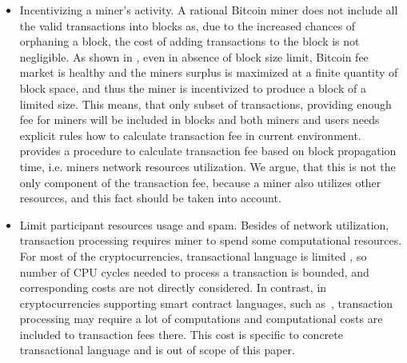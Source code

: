 \documentclass[]{article}   %
\newcommand{\authnote}[2]{\marginpar{\parbox{\marginparwidth}{\tiny %
  \textsf{#1 {\textcolor{blue}{notes: #2}}}}}%
  \textcolor{blue}{\textbf{\dag}}}
\newcommand{\authnote}[2]{
  \textsf{#1 \textcolor{blue}{: #2}}}
\newcommand{\authnote}[2]{}
\newcommand{\knote}[1]{{\authnote{\textcolor{green}{Alex notes}}{#1}}}
\begin{document}
\begin{itemize}
  \item{Incentivizing a miner's activity. } A rational Bitcoin miner does not include all the valid transactions into blocks as, due to the increased chances of orphaning a block, the cost of adding transactions to the block is not negligible\cite{rizun2015transaction, andresen2013}. As shown in \cite{rizun2015transaction}, even in absence of block size limit, Bitcoin fee market is healthy and the miners surplus is maximized at a finite quantity of block space, and thus the miner is incentivized to produce a block of a limited size. This means, that only subset of transactions, providing enough fee for miners will be included in blocks and both miners and users needs explicit rules how to calculate transaction fee in current environment. \knote{Isn't this claim way too bold and unproven?} \cite{rizun2015transaction} provides a procedure to calculate transaction fee based on block propagation time, i.e. miners network resources utilization. We argue, that this is not the only component of the transaction fee, because a miner also utilizes other resources, and this fact should be taken into account.

  \item{Limit participant resources usage and spam. } Besides of network utilization, transaction processing requires miner to spend some computational resources. For most of the cryptocurrencies, transactional language is limited \cite{script}, so number of CPU cycles needed to process a transaction is bounded, and corresponding costs are not directly considered. In contrast, in cryptocurrencies supporting  smart contract languages, such as~\cite{seijas2016scripting, tezosScript, solidity}, transaction processing may require a lot of computations and computational costs are included to transaction fees there. This cost is specific to concrete transactional language and is out of scope of this paper.

\end{itemize}
\end{document}

